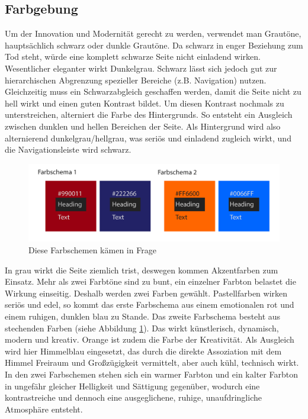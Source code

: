 	\subsection{Farbgebung\label{emo_col}}

Um der Innovation und Modernität gerecht zu werden, verwendet man Grautöne, hauptsächlich schwarz oder dunkle Grautöne. Da schwarz in enger Beziehung zum Tod steht, würde eine komplett schwarze Seite nicht einladend wirken. Wesentlicher eleganter wirkt Dunkelgrau. Schwarz lässt sich jedoch gut zur hierarchischen Abgrenzung spezieller Bereiche (z.B. Navigation) nutzen. Gleichzeitig muss ein Schwarzabgleich geschaffen werden, damit die Seite nicht zu hell wirkt und einen guten Kontrast bildet. Um diesen Kontrast nochmals zu unterstreichen, alterniert die Farbe des Hintergrunds. So entsteht ein Ausgleich zwischen dunklen und hellen Bereichen der Seite. Als Hintergrund wird also alternierend dunkelgrau/hellgrau, was seriös und einladend zugleich wirkt, und die Navigationsleiste wird schwarz. 

\begin{figure} [h]
\includegraphics[width=\textwidth]{./img/inno_col1.png}
\caption{Diese Farbschemen kämen in Frage}
\label{inno_Farbschemen1}
\end{figure}


In grau wirkt die Seite ziemlich trist, deswegen kommen Akzentfarben zum Einsatz. Mehr als zwei Farbtöne sind zu bunt, ein einzelner Farbton belastet die Wirkung einseitig. Deshalb werden zwei Farben gewählt. Pastellfarben wirken seriös und edel, so kommt das erste Farbschema aus einem emotionalen rot und einem ruhigen, dunklen blau zu Stande. Das zweite Farbschema besteht aus stechenden Farben (siehe Abbildung \ref{inno_Farbschemen1}). Das wirkt künstlerisch, dynamisch, modern und kreativ. Orange ist zudem die Farbe der Kreativität. Als Ausgleich wird hier Himmelblau eingesetzt, das durch die direkte Assoziation mit dem Himmel Freiraum und Großzügigkeit vermittelt, aber auch kühl, technisch wirkt. In den zwei Farbschemen stehen sich ein warmer Farbton und ein kalter Farbton in ungefähr gleicher Helligkeit und Sättigung gegenüber, wodurch eine kontrastreiche und dennoch eine ausgeglichene, ruhige, unaufdringliche Atmosphäre entsteht.

